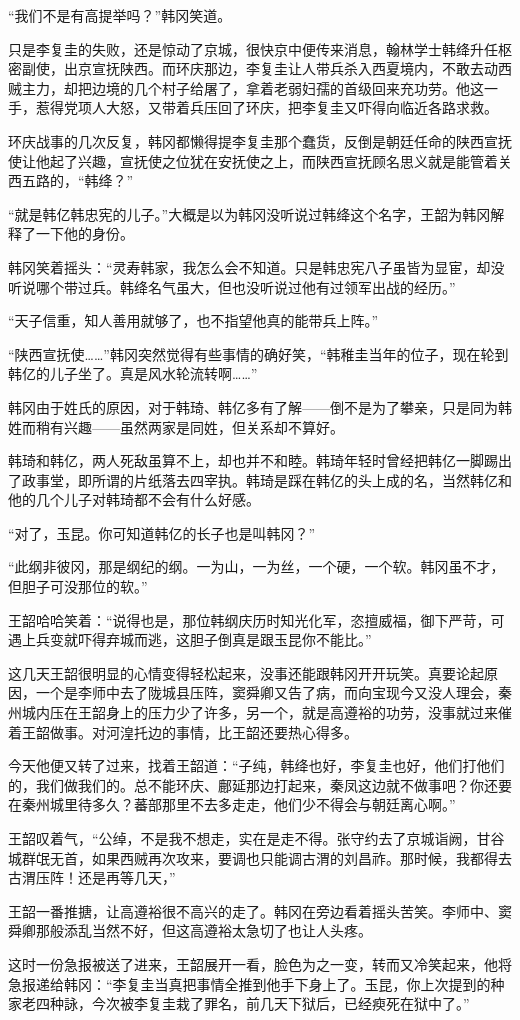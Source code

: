 “我们不是有高提举吗？”韩冈笑道。

只是李复圭的失败，还是惊动了京城，很快京中便传来消息，翰林学士韩绛升任枢密副使，出京宣抚陕西。而环庆那边，李复圭让人带兵杀入西夏境内，不敢去动西贼主力，却把边境的几个村子给屠了，拿着老弱妇孺的首级回来充功劳。他这一手，惹得党项人大怒，又带着兵压回了环庆，把李复圭又吓得向临近各路求救。

环庆战事的几次反复，韩冈都懒得提李复圭那个蠢货，反倒是朝廷任命的陕西宣抚使让他起了兴趣，宣抚使之位犹在安抚使之上，而陕西宣抚顾名思义就是能管着关西五路的，“韩绛？”

“就是韩亿韩忠宪的儿子。”大概是以为韩冈没听说过韩绛这个名字，王韶为韩冈解释了一下他的身份。

韩冈笑着摇头：“灵寿韩家，我怎么会不知道。只是韩忠宪八子虽皆为显宦，却没听说哪个带过兵。韩绛名气虽大，但也没听说过他有过领军出战的经历。”

“天子信重，知人善用就够了，也不指望他真的能带兵上阵。”

“陕西宣抚使……”韩冈突然觉得有些事情的确好笑，“韩稚圭当年的位子，现在轮到韩亿的儿子坐了。真是风水轮流转啊……”

韩冈由于姓氏的原因，对于韩琦、韩亿多有了解——倒不是为了攀亲，只是同为韩姓而稍有兴趣——虽然两家是同姓，但关系却不算好。

韩琦和韩亿，两人死敌虽算不上，却也并不和睦。韩琦年轻时曾经把韩亿一脚踢出了政事堂，即所谓的片纸落去四宰执。韩琦是踩在韩亿的头上成的名，当然韩亿和他的几个儿子对韩琦都不会有什么好感。

“对了，玉昆。你可知道韩亿的长子也是叫韩冈？”

“此纲非彼冈，那是纲纪的纲。一为山，一为丝，一个硬，一个软。韩冈虽不才，但胆子可没那位的软。”

王韶哈哈笑着：“说得也是，那位韩纲庆历时知光化军，恣擅威福，御下严苛，可遇上兵变就吓得弃城而逃，这胆子倒真是跟玉昆你不能比。”

这几天王韶很明显的心情变得轻松起来，没事还能跟韩冈开开玩笑。真要论起原因，一个是李师中去了陇城县压阵，窦舜卿又告了病，而向宝现今又没人理会，秦州城内压在王韶身上的压力少了许多，另一个，就是高遵裕的功劳，没事就过来催着王韶做事。对河湟托边的事情，比王韶还要热心得多。

今天他便又转了过来，找着王韶道：“子纯，韩绛也好，李复圭也好，他们打他们的，我们做我们的。总不能环庆、鄜延那边打起来，秦凤这边就不做事吧？你还要在秦州城里待多久？蕃部那里不去多走走，他们少不得会与朝廷离心啊。”

王韶叹着气，“公绰，不是我不想走，实在是走不得。张守约去了京城诣阙，甘谷城群氓无首，如果西贼再次攻来，要调也只能调古渭的刘昌祚。那时候，我都得去古渭压阵！还是再等几天，”

王韶一番推搪，让高遵裕很不高兴的走了。韩冈在旁边看着摇头苦笑。李师中、窦舜卿那般添乱当然不好，但这高遵裕太急切了也让人头疼。

这时一份急报被送了进来，王韶展开一看，脸色为之一变，转而又冷笑起来，他将急报递给韩冈：“李复圭当真把事情全推到他手下身上了。玉昆，你上次提到的种家老四种詠，今次被李复圭栽了罪名，前几天下狱后，已经瘐死在狱中了。”

